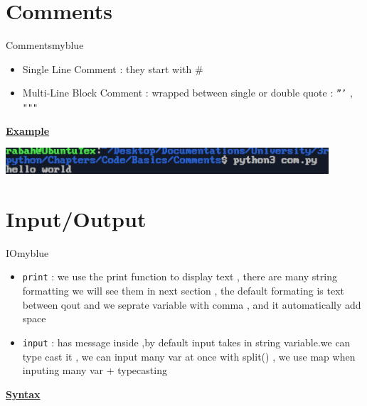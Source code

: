 \vspace{0.5cm}


\section{Comments}
\begin{prettyBox}{Comments}{myblue}
\begin{itemize}
    \item Single Line Comment : they start with \#
    \item Multi-Line Block Comment : wrapped between single or double quote : \texttt{'''} , \texttt{"""}
\end{itemize}
\end{prettyBox}

\vspace{0.35cm}
\textbf{\underline{Example}}\\[0.1cm]


\vspace{0.25cm}
\begin{center}
    \includegraphics[width = 0.9\textwidth]{Chapters/ScreenShot/Basics/Comments/comOutput.png}
\end{center}

\vspace{1cm}
\section{Input/Output}
\begin{prettyBox}{IO}{myblue}
\begin{itemize}
    \item \texttt{print} : we use the print function to display text , 
        there are many string formatting we will see them in next section , the default formating
        is text between qout and we seprate variable with comma , and it automatically add space
    \item \texttt{input} : has message inside ,by default input takes in string variable.we can type
        cast it , we can input many var at once with split() , we use map when inputing many var + 
        typecasting
\end{itemize}
\end{prettyBox}

\vspace{0.5cm}
\textbf{\underline{Syntax}}\\[0.1cm]


